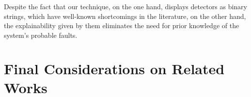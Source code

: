 Despite the fact that our technique, on the one hand, displays detectors as binary strings, which have well-known shortcomings in the literature, on the other hand, the explainability given by them eliminates the need for prior knowledge of the system's probable faults.

\section{Final Considerations on Related Works}






